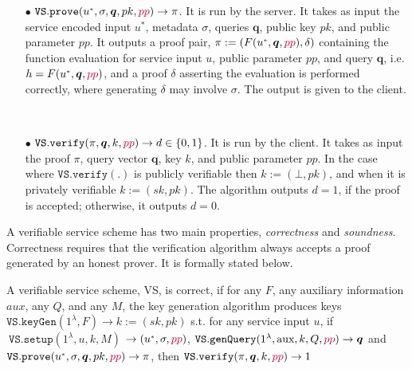 \begin{definition}[VS Scheme]
\begin{itemize}
\




\item[$\bullet$] $\mathtt{VS.prove}(u^{\scriptscriptstyle *},\sigma, \bm{q}, pk,{\color{purple}pp})\rightarrow \pi$. It is run by the server. It  takes as input the service encoded input $u^{\scriptscriptstyle *}$, metadata $\sigma$,   queries $\bm{q}$, public key $pk$, and {\color{purple} public parameter  $pp$}. It outputs a proof pair, $\pi :=(F(u^{\scriptscriptstyle *}, \bm{q},{\color{purple}pp}),\delta)$ containing the function evaluation for service input $u$, {\color{purple}public parameter $pp$}, and query $\bm{q}$, i.e. $h=F(u^{\scriptscriptstyle *},\bm{q},{\color{purple}pp})$, and a proof $\delta$ asserting the evaluation is performed correctly, where generating $\delta$ may involve $\sigma$. The output is given to the client. 

\

\item[$\bullet$] $\mathtt{VS.verify}(\pi, \bm{q}, k, {\color{purple}pp})\rightarrow d\in\{0,1\}$. It is run by the client. It takes as input the proof $\pi$,   query vector $\bm{q}$,   key  $k$, and {\color{purple}public parameter $pp$}.   In the case where $\mathtt{VS.verify}(.)$ is publicly verifiable then $k:=(\bot,pk)$,  and when it is privately verifiable $k:=(sk,pk)$. The algorithm  outputs $d=1$, if the proof is accepted; otherwise, it outputs $d=0$. 



\end{itemize}
\end{definition}


A verifiable service scheme has two main properties, \emph{correctness} and \emph{soundness}. Correctness requires that  the verification algorithm always accepts a proof generated by an honest prover.  It is formally stated below.

\begin{definition}[VS Correctness] A verifiable service scheme, VS, is  correct,  if for any $F$,  any auxiliary information $aux$, any  $Q$, and any $M$, the key generation algorithm produces keys $\mathtt{VS.keyGen}(1^{\lambda},F)\rightarrow k:=(sk,pk)$ s.t. for any service input $u$, if $\ \mathtt{VS.setup}(1^{\lambda}, u,k,M)$ $\rightarrow (u^{\scriptscriptstyle *},\sigma, {\color{purple}pp})$,  $\mathtt{VS.genQuery}(1^{\lambda}, \text{aux},k,Q, {\color{purple}pp})\rightarrow \bm{q}$ and $\mathtt{VS.prove}(u^{\scriptscriptstyle *},\sigma, \bm{q},pk, {\color{purple}pp})\rightarrow \pi$, then $\mathtt{VS.verify}(\pi, \bm{q}, k, {\color{purple}pp})\rightarrow 1$
\end{definition}

